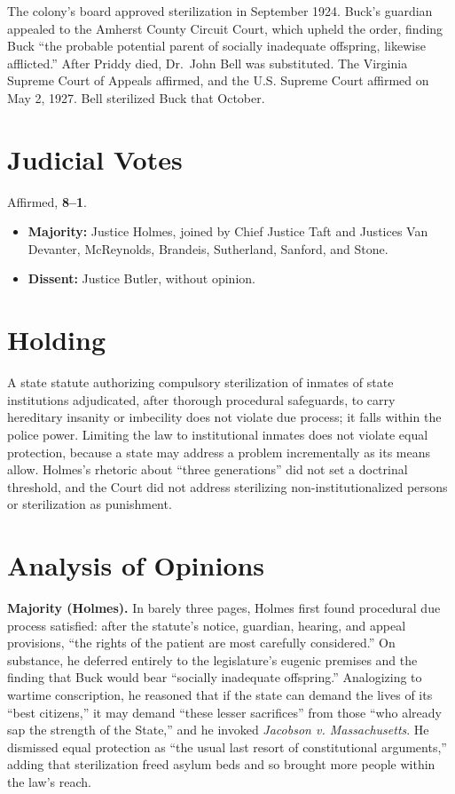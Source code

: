 \documentclass[12pt]{article}
\begin{document}
The colony's board approved sterilization in September 1924. Buck's guardian appealed to the Amherst County Circuit Court, which upheld the order, finding Buck ``the probable potential parent of socially inadequate offspring, likewise afflicted.'' After Priddy died, Dr.\ John Bell was substituted. The Virginia Supreme Court of Appeals affirmed, and the U.S. Supreme Court affirmed on May 2, 1927. Bell sterilized Buck that October.

\section{Judicial Votes}

Affirmed, \textbf{8--1}.
\begin{itemize}
\item \textbf{Majority:} Justice Holmes, joined by Chief Justice Taft and Justices Van Devanter, McReynolds, Brandeis, Sutherland, Sanford, and Stone.
\item \textbf{Dissent:} Justice Butler, without opinion.
\end{itemize}

\section{Holding}

A state statute authorizing compulsory sterilization of inmates of state institutions adjudicated, after thorough procedural safeguards, to carry hereditary insanity or imbecility does not violate due process; it falls within the police power. Limiting the law to institutional inmates does not violate equal protection, because a state may address a problem incrementally as its means allow. Holmes's rhetoric about ``three generations'' did not set a doctrinal threshold, and the Court did not address sterilizing non-institutionalized persons or sterilization as punishment.

\section{Analysis of Opinions}

\textbf{Majority (Holmes).} In barely three pages, Holmes first found procedural due process satisfied: after the statute's notice, guardian, hearing, and appeal provisions, ``the rights of the patient are most carefully considered.'' On substance, he deferred entirely to the legislature's eugenic premises and the finding that Buck would bear ``socially inadequate offspring.'' Analogizing to wartime conscription, he reasoned that if the state can demand the lives of its ``best citizens,'' it may demand ``these lesser sacrifices'' from those ``who already sap the strength of the State,'' and he invoked \textit{Jacobson v. Massachusetts}. He dismissed equal protection as ``the usual last resort of constitutional arguments,'' adding that sterilization freed asylum beds and so brought more people within the law's reach.
\end{document}
